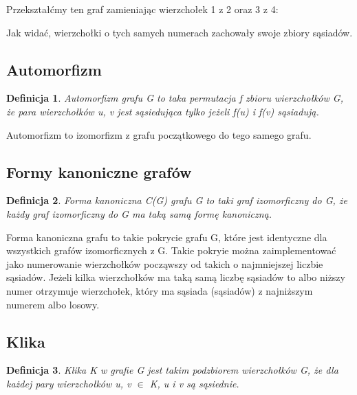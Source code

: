 \documentclass[11pt]{article}
\newtheorem{definition}{Definicja}[section]
\begin{document}
  Przekształćmy ten graf zamieniając wierzchołek 1 z 2 oraz 3 z 4:


  Jak widać, wierzchołki o tych samych numerach zachowały swoje zbiory sąsiadów. 

  \subsection{Automorfizm}

  \begin{definition}
    Automorfizm grafu G to taka permutacja f zbioru wierzchołków G, że para wierzchołków u, v jest sąsiedująca tylko jeżeli f(u) i f(v) sąsiadują. 
  \end{definition}
  Automorfizm to izomorfizm z grafu początkowego do tego samego grafu. 

  \subsection{Formy kanoniczne grafów}

  \begin{definition}
    Forma kanoniczna C(G) grafu G to taki graf izomorficzny do G, że każdy graf izomorficzny do G ma taką samą formę kanoniczną. 
  \end{definition}
  Forma kanoniczna grafu to takie pokrycie grafu G, 
  które jest identyczne dla wszystkich grafów izomorficznych z G. Takie pokryie można zaimplementować
   jako numerowanie wierzchołków począwszy od takich o najmniejszej liczbie sąsiadów. 
   Jeżeli kilka wierzchołków ma taką samą liczbę sąsiadów to albo niższy numer otrzymuje wierzchołek, 
   który ma sąsiada (sąsiadów) z najniższym numerem albo losowy. 

   \subsection{Klika}
   \begin{definition}
    Klika K w grafie G jest takim podzbiorem wierzchołków G, że dla każdej pary wierzchołków u, v $\in$ K, u i v są sąsiednie. 
   \end{definition}
   
\end{document}
